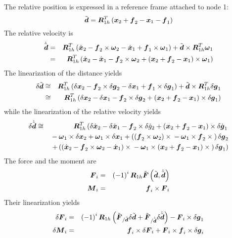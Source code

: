\documentclass[10pt,dvips]{report}
\newcommand{\T}[1]{\boldsymbol{#1}}
\begin{document}
\noindent
The relative position is expressed in a reference frame attached to node 1:
\begin{equation*}
	\tilde{\T{d}} = \T{R}_{1h}^T\plbr{
		\T{x}_2 + \T{f}_2 - \T{x}_1 - \T{f}_1
	}
\end{equation*}
The relative velocity is
\begin{eqnarray*}
	\dot{\tilde{\T{d}}} & = & \T{R}_{1h}^T\plbr{
		\dot{\T{x}}_2 - \T{f}_2\times\T{\omega}_2
		- \dot{\T{x}}_1 + \T{f}_1\times\T{\omega}_1
	} + \tilde{\T{d}}\times\T{R}_{1h}^T \T{\omega}_1 \\
	& = & \T{R}_{1h}^T\plbr{
		\dot{\T{x}}_2 - \dot{\T{x}}_1
		- \T{f}_2\times\T{\omega}_2
		+ \plbr{\T{x}_2 + \T{f}_2 - \T{x}_1}\times\T{\omega}_1
	}
\end{eqnarray*}
The linearization of the distance yields
\begin{eqnarray*}
	\delta{\tilde{\T{d}}} & \cong & \T{R}_{1h}^T\plbr{
		\delta{\T{x}}_2 - \T{f}_2\times\delta\T{g}_2
		- \delta{\T{x}}_1 + \T{f}_1\times\delta\T{g}_1
	} + \tilde{\T{d}}\times\T{R}_{1h}^T \delta\T{g}_1 \\
	& \cong & \T{R}_{1h}^T\plbr{
		\delta{\T{x}}_2 - \delta{\T{x}}_1
		- \T{f}_2\times\delta\T{g}_2
		+ \plbr{\T{x}_2 + \T{f}_2 - \T{x}_1}\times\delta\T{g}_1
	}
\end{eqnarray*}
while the linearization of the relative velocity yields
\begin{eqnarray*}
	\delta\dot{\tilde{\T{d}}} & \cong & \T{R}_{1h}^T\lplbr{
		\delta\dot{\T{x}}_2
		- \delta\dot{\T{x}}_1
		- \T{f}_2\times\delta\dot{g}_2
		+ \plbr{\T{x}_2 + \T{f}_2 - \T{x}_1}\times\delta\dot{\T{g}}_1
	} \\
	& & \mbox{} - \T{\omega}_1 \times \delta\T{x}_2
		+ \T{\omega}_1 \times \delta\T{x}_1
		+ \plbr{
			\plbr{\T{f}_2 \times \T{\omega}_2}\times{}
			- \T{\omega}_1 \times \T{f}_2 \times{}
		} \delta\T{g}_2 \\
	& & \rplbr{
		+ \plbr{
			\plbr{
				\dot{\T{x}}_2
				- \T{f}_2 \times \T{\omega}_2 
				- \dot{\T{x}}_1
			} \times{} - \T{\omega}_1 \times \plbr{
				\T{x}_2 + \T{f}_2 - \T{x}_1
			}\times{}
		} \delta\T{g}_1
	}
\end{eqnarray*}
The force and the moment are
\begin{eqnarray*}
	\T{F}_i & = & \plbr{ -1 }^i \T{R}_{1h} \tilde{\T{F}}\plbr{\tilde{\T{d}}, \dot{\tilde{\T{d}}}} \\
	\T{M}_i & = & \T{f}_i \times \T{F}_i
\end{eqnarray*}
Their linearization yields
\begin{eqnarray*}
	\delta\T{F}_i & = & \plbr{ -1 }^i \T{R}_{1h} \plbr{
		\tilde{\T{F}}_{/\tilde{\T{d}}} \delta{\tilde{\T{d}}}
		+ \tilde{\T{F}}_{/\dot{\tilde{\T{d}}}} \delta\dot{\tilde{\T{d}}}
	} - \T{F}_i \times \delta\T{g}_1 \\
	\delta\T{M}_i & = & \T{f}_i \times \delta\T{F}_i + \T{F}_i \times \T{f}_i \times \delta\T{g}_i
\end{eqnarray*}
\end{document}
